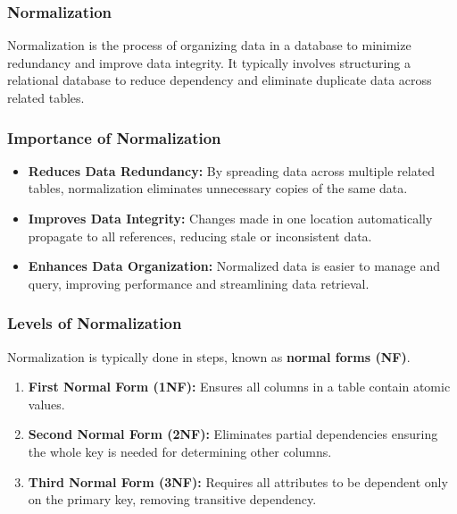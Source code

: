 \documentclass[aspectratio=169]{beamer}
\begin{document}
\begin{frame}[fragile]
    \frametitle{Normalization}
    Normalization is the process of organizing data in a database to minimize redundancy and improve data integrity. 
    It typically involves structuring a relational database to reduce dependency and eliminate duplicate data across related tables.
\end{frame}

\begin{frame}[fragile]
    \frametitle{Importance of Normalization}
    \begin{itemize}
        \item \textbf{Reduces Data Redundancy:} 
        By spreading data across multiple related tables, normalization eliminates unnecessary copies of the same data.
        
        \item \textbf{Improves Data Integrity:} 
        Changes made in one location automatically propagate to all references, reducing stale or inconsistent data.
        
        \item \textbf{Enhances Data Organization:} 
        Normalized data is easier to manage and query, improving performance and streamlining data retrieval.
    \end{itemize}
\end{frame}

\begin{frame}[fragile]
    \frametitle{Levels of Normalization}
    Normalization is typically done in steps, known as \textbf{normal forms (NF)}.

    \begin{enumerate}
        \item \textbf{First Normal Form (1NF):} 
        Ensures all columns in a table contain atomic values.
        
        \item \textbf{Second Normal Form (2NF):} 
        Eliminates partial dependencies ensuring the whole key is needed for determining other columns.

        \item \textbf{Third Normal Form (3NF):} 
        Requires all attributes to be dependent only on the primary key, removing transitive dependency.
    \end{enumerate}
\end{frame}
\end{document}
